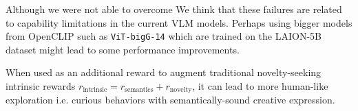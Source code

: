 Although we were not able to overcome 
We think that these failures are related to capability limitations in the current VLM models.
Perhaps using bigger models from OpenCLIP such as \texttt{ViT-bigG-14} \citep{openclip} which are trained on the LAION-5B dataset \citep{laion5b} might lead to some performance improvements.






When used as an additional reward to augment traditional novelty-seeking intrinsic rewards \(r_{\text{intrinsic}} = r_{\text{semantics}} + r_{\text{novelty}}\), it can lead to more human-like exploration i.e. curious behaviors with semantically-sound creative expression.
